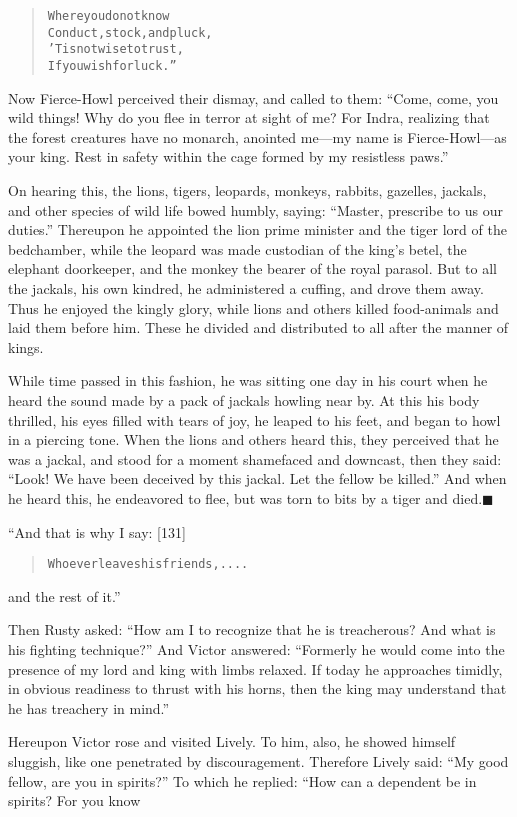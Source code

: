 \documentclass[article, twoside, 14pt]{memoir}
\newcommand{\qed}{\hfill \ensuremath{\blacksquare}}
\renewenvironment{verbatim}{%
\begin{quote}%
\vskip -10pt%
\begin{alltt}\normalfont\large}{\end{alltt}%
\end{quote}%
\vskip -10pt
} %
\begin{document}
\begin{verbatim}
Where you do not know
    Conduct, stock, and pluck,
'Tis not wise to trust,
    If you wish for luck.”
\end{verbatim}
Now Fierce-Howl perceived their dismay, and called to them:
``Come, come, you wild things! Why do you flee in terror at sight of me? For Indra, realizing that the forest creatures have no monarch, anointed me---my name is Fierce-Howl---as your king. Rest in safety within the cage formed by my resistless paws.''

On hearing this, the lions, tigers, leopards, monkeys, rabbits,
gazelles, jackals, and other species of wild life bowed humbly,
saying: ``Master, prescribe to us our duties.'' Thereupon he
appointed the lion prime minister and the tiger lord of the
bedchamber, while the leopard was made custodian of the king's
betel, the elephant doorkeeper, and the monkey the bearer of the
royal parasol. But to all the jackals, his own kindred, he
administered a cuffing, and drove them away. Thus he enjoyed the
kingly glory, while lions and others killed food-animals and laid
them before him. These he divided and distributed to all after the
manner of kings.

While time passed in this fashion, he was sitting one day in his
court when he heard the sound made by a pack of jackals howling
near by. At this his body thrilled, his eyes filled with tears of
joy, he leaped to his feet, and began to howl in a piercing tone.
When the lions and others heard this, they perceived that he was a
jackal, and stood for a moment shamefaced and downcast, then they
said:
``Look! We have been deceived by this jackal. Let the fellow be killed.''
And when he heard this, he endeavored to flee, but was torn to bits
by a tiger and died.\hyperref[s14]{\qed}

“And that is why I say: [131]

\begin{verbatim}
Whoever leaves his friends, ....
\end{verbatim}
and the rest of it.”

Then Rusty asked:
``How am I to recognize that he is treacherous? And what is his fighting technique?''
And Victor answered:
``Formerly he would come into the presence of my lord and king with limbs relaxed. If today he approaches timidly, in obvious readiness to thrust with his horns, then the king may understand that he has treachery in mind.''

Hereupon Victor rose and visited Lively. To him, also, he showed
himself sluggish, like one penetrated by discouragement. Therefore
Lively said: ``My good fellow, are you in spirits?'' To which he
replied: “How can a dependent be in spirits? For you know
\end{document}

